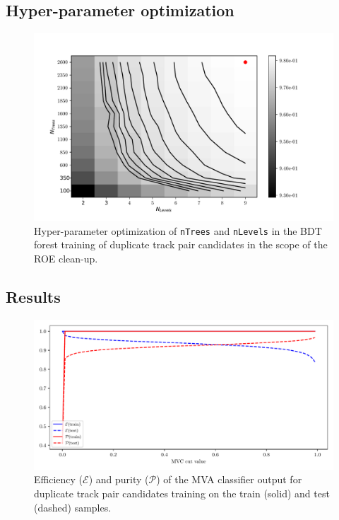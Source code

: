 \documentclass[headings=standardclasses,headings=big,oneside,a4paper,openany,12pt]{scrbook}
\begin{document}
\subsection*{Hyper-parameter optimization}

\begin{figure}[H]
\centering
\captionsetup{width=0.8\linewidth}
\includegraphics[width=\linewidth]{fig/addendums/dup_hpo}
\caption{Hyper-parameter optimization of \texttt{nTrees} and \texttt{nLevels} in the BDT forest training of duplicate track pair candidates in the scope of the ROE clean-up.}
\end{figure}

\subsection*{Results}

\begin{figure}[H]
\centering
\captionsetup{width=0.8\linewidth}
\includegraphics[width=\linewidth]{fig/addendums/dup_effpur}
\caption{Efficiency ($\mathcal{E}$) and purity ($\mathcal{P}$) of the MVA classifier output for duplicate track pair candidates training on the train (solid) and test (dashed) samples.}
\end{figure}
\end{document}
